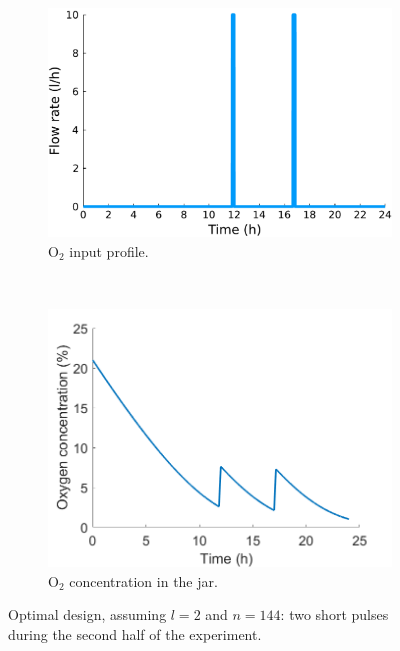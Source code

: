 \begin{figure}
	\centering
	\begin{subfigure}[b]{0.45\textwidth}
		\includegraphics[width=\textwidth]{figure/paper 1/extra6}
		\caption{$\text{O}_2$ input profile.}
		\label{input2}
	\end{subfigure}
	~ %
	\begin{subfigure}[b]{0.45\textwidth}
		\includegraphics[width=\textwidth]{figure/paper 1/design2.png}
		\caption{$\text{O}_2$ concentration in the jar.}
		\label{output2}
	\end{subfigure}
	\caption{Optimal design, assuming $l=2$ and $n=144$: two short pulses during the second half of the experiment.}
	\label{figODE2}
\end{figure}
